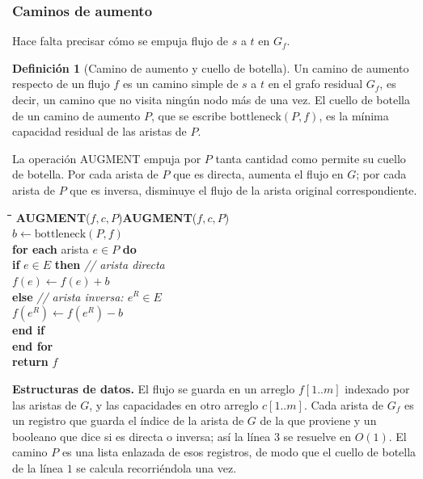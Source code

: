 \documentclass[12pt, spanish, oneside, openany]{book}
\newcommand{\pl}[1]{\makebox[1.6em][r]{\texttt{\footnotesize #1}}\hspace{0.9em}}
\newenvironment{pseudo}[1]{%
  \begin{center}%
  \begin{mdframed}[style=pseudobox]%
  \small
  \begin{tabbing}%
  \hspace{2.5em}\=\hspace{1.5em}\=\hspace{1.5em}\=\hspace{1.5em}\=\hspace{1.5em}\=\kill
  \def\pseudotitulo{#1}\ifx\pseudotitulo\empty\else#1\\[3pt]\fi}%
  {\end{tabbing}\end{mdframed}\end{center}}
\newenvironment{estructuras}%
  {\begin{center}\begin{minipage}{0.93\textwidth}\begin{mdframed}[style=estrbox]%
   \small\textbf{Estructuras de datos.}\;}%
  {\end{mdframed}\end{minipage}\end{center}}
\newcommand{\alg}[1]{#1}
\theoremstyle{uprightplain}
\theoremstyle{definition}
\newtheorem{definicion}[teorema]{Definición}
\theoremstyle{remark}
\theoremstyle{definition}
\begin{document}
\subsubsection{Caminos de aumento}

Hace falta precisar cómo se empuja flujo de $s$ a $t$ en $G_f$.

\begin{definicion}[Camino de aumento y cuello de botella]
\label{def:camino-aumento}
Un camino de aumento respecto de un flujo $f$ es un camino simple de $s$ a $t$ en el grafo residual $G_f$, es decir, un camino que no visita ningún nodo más de una vez. El cuello de botella de un camino de aumento $P$, que se escribe $\mathrm{bottleneck}(P,f)$, es la mínima capacidad residual de las aristas de $P$.
\end{definicion}

La operación \alg{AUGMENT} empuja por $P$ tanta cantidad como permite su cuello de botella. Por cada arista de $P$ que es directa, aumenta el flujo en $G$; por cada arista de $P$ que es inversa, disminuye el flujo de la arista original correspondiente.

\begin{pseudo}{\textbf{AUGMENT}($f,c,P$)}
\pl{1}\> $b \leftarrow \mathrm{bottleneck}(P,f)$\\
\pl{2}\> \textbf{for each} arista $e\in P$ \textbf{do}\\
\pl{3}\>\> \textbf{if} $e\in E$ \textbf{then} \hspace{1em}\textit{// arista directa}\\
\pl{4}\>\>\> $f(e)\leftarrow f(e)+b$\\
\pl{5}\>\> \textbf{else} \hspace{4.2em}\textit{// arista inversa: $e^{R}\in E$}\\
\pl{6}\>\>\> $f(e^{R})\leftarrow f(e^{R})-b$\\
\pl{7}\>\> \textbf{end if}\\
\pl{8}\> \textbf{end for}\\
\pl{9}\> \textbf{return} $f$
\end{pseudo}

\begin{estructuras}
El flujo se guarda en un arreglo $f[1..m]$ indexado por las aristas de $G$, y
las capacidades en otro arreglo $c[1..m]$. Cada arista de $G_f$ es un registro
que guarda el índice de la arista de $G$ de la que proviene y un booleano que
dice si es directa o inversa; así la línea $3$ se resuelve en $O(1)$. El camino
$P$ es una lista enlazada de esos registros, de modo que el cuello de botella de
la línea $1$ se calcula recorriéndola una vez.
\end{estructuras}
\end{document}
